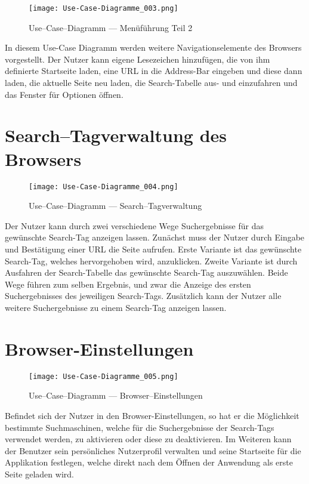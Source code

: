 \begin{figure}[htb]
\texttt{[image: Use-Case-Diagramme\_003.png]}
	\caption{Use--Case--Diagramm --- Menüführung Teil 2}
	\label{fig:Menüführung Teil 2}
\end{figure}
In diesem Use-Case Diagramm werden weitere Navigationselemente des Browsers vorgestellt. Der Nutzer kann eigene Lesezeichen hinzufügen, die von ihm definierte Startseite laden, eine URL in die Address-Bar eingeben und diese dann laden, die aktuelle Seite neu laden, die Search-Tabelle aus- und einzufahren und das Fenster für Optionen öffnen.

\section{Search--Tagverwaltung des Browsers}
\begin{figure}[htb]
\texttt{[image: Use-Case-Diagramme\_004.png]}
	\caption{Use--Case--Diagramm --- Search--Tagverwaltung}
	\label{fig:Search-Tagverwaltung}
\end{figure}
Der Nutzer kann durch zwei verschiedene Wege Suchergebnisse für das gewünschte Search-Tag anzeigen lassen. Zunächst muss der Nutzer durch Eingabe und Bestätigung einer URL die Seite aufrufen. Erste Variante ist das gewünschte Search-Tag, welches hervorgehoben wird, anzuklicken. Zweite Variante ist durch Ausfahren der Search-Tabelle das gewünschte Search-Tag auszuwählen. Beide Wege führen zum selben Ergebnis, und zwar die Anzeige des ersten Suchergebnisses des jeweiligen Search-Tags. Zusätzlich kann der Nutzer alle weitere Suchergebnisse zu einem Search-Tag anzeigen lassen.

\section{Browser-Einstellungen}
\begin{figure}[htb]
\texttt{[image: Use-Case-Diagramme\_005.png]}
	\caption{Use--Case--Diagramm --- Browser--Einstellungen}
	\label{fig:Browser-Einstellungen}
\end{figure}
Befindet sich der Nutzer in den Browser-Einstellungen, so hat er die Möglichkeit bestimmte Suchmaschinen, welche für die Suchergebnisse der Search-Tags verwendet werden, zu aktivieren oder diese zu deaktivieren. Im Weiteren kann der Benutzer sein persönliches Nutzerprofil verwalten und seine Startseite für die Applikation festlegen, welche direkt nach dem Öffnen der Anwendung als erste Seite geladen wird.
